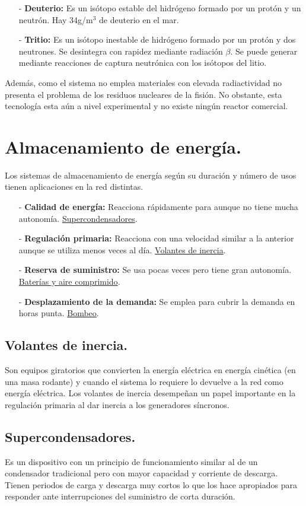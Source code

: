 \begin{itemize}
	\item [-] \textbf{Deuterio:} Es un isótopo estable del hidrógeno formado por un protón y un neutrón. Hay 34g/m$^3$ de deuterio en el mar.
	\item [-]\textbf{Tritio:}  Es un isótopo inestable de hidrógeno formado por un protón y dos neutrones. Se desintegra con rapidez mediante radiación $\beta$. Se puede generar mediante reacciones de captura neutrónica con los isótopos del litio.
\end{itemize} 

Además, como el sistema no emplea materiales con elevada radiactividad no presenta el problema de los residuos nucleares de la fisión. No obstante, esta tecnología esta aún a nivel experimental y no existe ningún reactor comercial.
\section{Almacenamiento de energía.}
Los sistemas de almacenamiento de energía según su duración y número de usos tienen aplicaciones en la red distintas.
\begin{itemize}
	\item [-] \textbf{Calidad de energía:} Reacciona rápidamente para aunque no tiene mucha autonomía. \underline{Supercondensadores}.
	\item [-] \textbf{Regulación primaria:} Reacciona con una velocidad similar a la anterior aunque se utiliza menos veces al día. \underline{Volantes de inercia}. 
	\item [-] \textbf{Reserva de suministro:} Se usa pocas veces pero tiene gran autonomía. \underline{Baterías y aire comprimido}.
	\item [-] \textbf{Desplazamiento de la demanda:} Se emplea para cubrir la demanda en horas punta. \underline{Bombeo}.
\end{itemize}
\newpage
\subsection{Volantes de inercia.}
Son equipos giratorios que convierten la energía eléctrica en energía cinética (en una masa rodante) y cuando el sistema lo requiere lo devuelve a la red como energía eléctrica. Los volantes de inercia desempeñan un papel importante en la regulación primaria al dar inercia a los generadores síncronos.
\subsection{Supercondensadores.}
Es un dispositivo con un principio de funcionamiento similar al de un condensador tradicional pero con mayor capacidad y corriente de descarga. Tienen periodos de carga y descarga muy cortos lo que los hace apropiados para responder ante interrupciones del suministro de corta duración.
